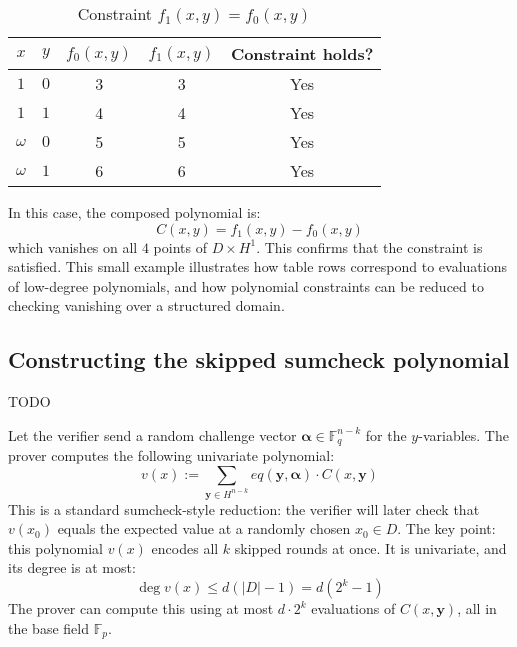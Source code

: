 \documentclass{article}
\newcommand{\Fp}{\mathbb F_p}
\newcommand{\Fq}{\mathbb F_q}
\begin{document}
\begin{table}[h!]
\centering
\caption{Constraint $f_1(x, y) = f_0(x, y)$}
\begin{tabular}{ccccc}
\toprule
$x$ & $y$ & $f_0(x, y)$ & $f_1(x, y)$ & Constraint holds? \\
\midrule
$1$     & $0$ & 3 & 3 & Yes \\
$1$     & $1$ & 4 & 4 & Yes \\
$\omega$ & $0$ & 5 & 5 & Yes \\
$\omega$ & $1$ & 6 & 6 & Yes \\
\bottomrule
\end{tabular}
\end{table}

In this case, the composed polynomial is:
\begin{equation}
C(x, y) = f_1(x, y) - f_0(x, y)
\end{equation}
which vanishes on all $4$ points of $D \times H^1$. This confirms that the constraint is satisfied. This small example illustrates how table rows correspond to evaluations of low-degree polynomials, and how polynomial constraints can be reduced to checking vanishing over a structured domain.




\subsection{Constructing the skipped sumcheck polynomial}

TODO

Let the verifier send a random challenge vector $\boldsymbol{\alpha} \in \Fq^{n-k}$ for the $y$-variables. The prover computes the following univariate polynomial:
\begin{equation}
v(x) := \sum_{\mathbf{y} \in H^{n-k}} eq(\mathbf{y}, \boldsymbol{\alpha}) \cdot C(x, \mathbf{y})
\end{equation}
This is a standard sumcheck-style reduction: the verifier will later check that $v(x_0)$ equals the expected value at a randomly chosen $x_0 \in D$. The key point: this polynomial $v(x)$ encodes all $k$ skipped rounds at once. It is univariate, and its degree is at most:
\begin{equation}
\deg v(x) \leq d (|D| - 1) = d(2^k - 1)
\end{equation}
The prover can compute this using at most $d \cdot 2^k$ evaluations of $C(x, \mathbf{y})$, all in the base field $\Fp$.


\end{document}
